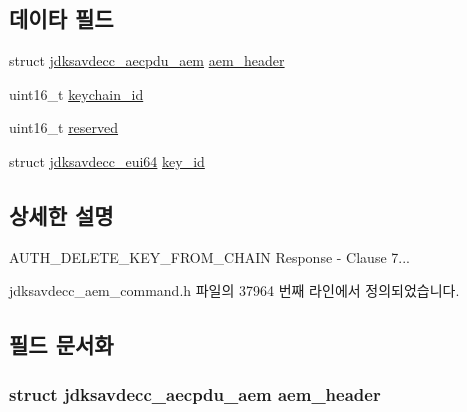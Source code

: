 \subsection*{데이타 필드}
\begin{DoxyCompactItemize}
\item 
struct \hyperlink{structjdksavdecc__aecpdu__aem}{jdksavdecc\+\_\+aecpdu\+\_\+aem} \hyperlink{structjdksavdecc__aem__command__auth__delete__key__from__chain__response_ae1e77ccb75ff5021ad923221eab38294}{aem\+\_\+header}
\item 
uint16\+\_\+t \hyperlink{structjdksavdecc__aem__command__auth__delete__key__from__chain__response_a10ed6547e01665c453e2a40b142f7526}{keychain\+\_\+id}
\item 
uint16\+\_\+t \hyperlink{structjdksavdecc__aem__command__auth__delete__key__from__chain__response_a5a6ed8c04a3db86066924b1a1bf4dad3}{reserved}
\item 
struct \hyperlink{structjdksavdecc__eui64}{jdksavdecc\+\_\+eui64} \hyperlink{structjdksavdecc__aem__command__auth__delete__key__from__chain__response_a37cbdf6056556ccfaee3ab01dc7c3032}{key\+\_\+id}
\end{DoxyCompactItemize}


\subsection{상세한 설명}
A\+U\+T\+H\+\_\+\+D\+E\+L\+E\+T\+E\+\_\+\+K\+E\+Y\+\_\+\+F\+R\+O\+M\+\_\+\+C\+H\+A\+IN Response -\/ Clause 7... 

jdksavdecc\+\_\+aem\+\_\+command.\+h 파일의 37964 번째 라인에서 정의되었습니다.



\subsection{필드 문서화}
\subsubsection[{\texorpdfstring{aem\+\_\+header}{aem_header}}]{\setlength{\rightskip}{0pt plus 5cm}struct {\bf jdksavdecc\+\_\+aecpdu\+\_\+aem} aem\+\_\+header}\hypertarget{structjdksavdecc__aem__command__auth__delete__key__from__chain__response_ae1e77ccb75ff5021ad923221eab38294}{}\label{structjdksavdecc__aem__command__auth__delete__key__from__chain__response_ae1e77ccb75ff5021ad923221eab38294}


